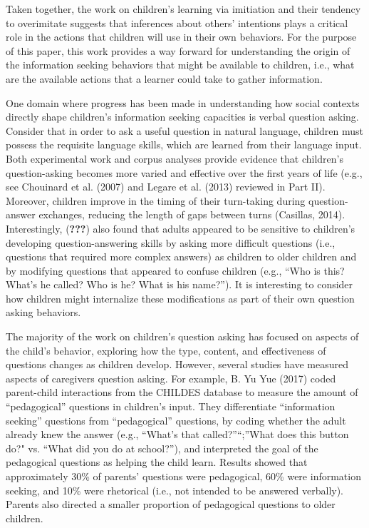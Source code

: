 \documentclass[english,man]{apa6}
\theoremstyle{definition}
\theoremstyle{definition}
\theoremstyle{definition}
\theoremstyle{remark}
\begin{document}
Taken together, the work on children's learning via imitiation and their
tendency to overimitate suggests that inferences about others'
intentions plays a critical role in the actions that children will use
in their own behaviors. For the purpose of this paper, this work
provides a way forward for understanding the origin of the information
seeking behaviors that might be available to children, i.e., what are
the available actions that a learner could take to gather information.

One domain where progress has been made in understanding how social
contexts directly shape children's information seeking capacities is
verbal question asking. Consider that in order to ask a useful question
in natural language, children must possess the requisite language
skills, which are learned from their language input. Both experimental
work and corpus analyses provide evidence that children's
question-asking becomes more varied and effective over the first years
of life (e.g., see Chouinard et al. (2007) and Legare et al. (2013)
reviewed in Part II). Moreover, children improve in the timing of their
turn-taking during question-answer exchanges, reducing the length of
gaps between turns (Casillas, 2014). Interestingly, ({\textbf{???}})
also found that adults appeared to be sensitive to children's developing
question-answering skills by asking more difficult questions (i.e.,
questions that required more complex answers) as children to older
children and by modifying questions that appeared to confuse children
(e.g., \enquote{Who is this? What's he called? Who is he? What is his
name?}). It is interesting to consider how children might internalize
these modifications as part of their own question asking behaviors.

The majority of the work on children's question asking has focused on
aspects of the child's behavior, exploring how the type, content, and
effectiveness of questions changes as children develop. However, several
studies have measured aspects of caregivers question asking. For
example, B. Yu Yue (2017) coded parent-child interactions from the
CHILDES database to measure the amount of \enquote{pedagogical}
questions in children's input. They differentiate \enquote{information
seeking} questions from \enquote{pedagogical} questions, by coding
whether the adult already knew the answer (e.g., \enquote{What's that
called?}\enquote{;}What does this button do?" vs. \enquote{What did you
do at school?}), and interpreted the goal of the pedagogical questions
as helping the child learn. Results showed that approximately 30\% of
parents' questions were pedagogical, 60\% were information seeking, and
10\% were rhetorical (i.e., not intended to be answered verbally).
Parents also directed a smaller proportion of pedagogical questions to
older children.
\end{document}
